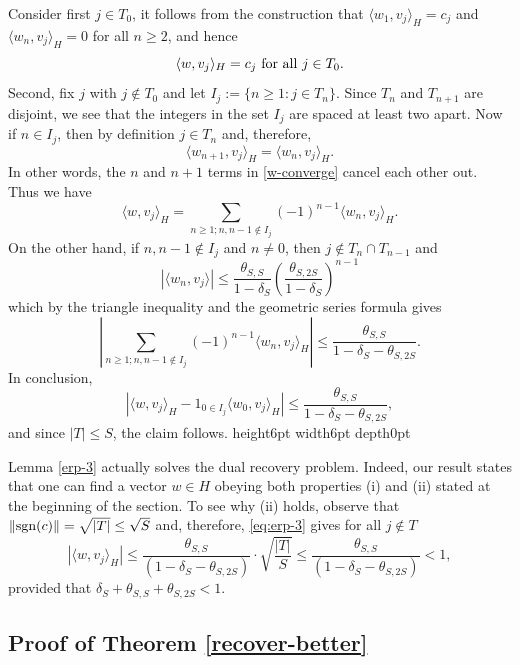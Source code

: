 \documentclass[11pt]{article}
\def\sgn{{\hbox{sgn}}}
\newenvironment{proof}{\noindent {\bf Proof} }{\endprf\par}
\def \endprf{\hfill {\vrule height6pt width6pt depth0pt}\medskip}
\newcommand{\<}{\langle}
\renewcommand{\>}{\rangle}
\numberwithin{equation}{section}
\begin{document}
\begin{proof}
Consider first $j \in T_0$, it follows from the construction that
$\langle w_1, v_j \rangle_H = c_j$ and $\langle w_n, v_j \rangle_H =
0$ for all $n \geq 2$, and hence
\[
\langle w, v_j \rangle_H = c_j \hbox{ for all } j \in T_0.
\]
Second, fix $j$ with $j \not \in T_0$ and let $I_j := \{ n \geq 1: j
\in T_n \}$.  Since $T_n$ and $T_{n+1}$ are disjoint, we see that the
integers in the set $I_j$ are spaced at least two apart.  Now if $n
\in I_j$, then by definition $j \in T_n$ and, therefore,
\[
\langle w_{n+1}, v_j \rangle_H = \langle w_n, v_j \rangle_H.
\]
In other words, the $n$ and $n+1$ terms in \eqref{w-converge} cancel
each other out.  Thus we have
\[
\langle w, v_j \rangle_H = \sum_{n \geq 1; n, n-1 \not \in I_j}
(-1)^{n-1} \langle w_n, v_j\rangle_H.
\]
On the other hand, if $n, n-1
\not \in I_j$ and $n \neq 0$, then $j \not \in T_n \cap T_{n-1}$ and 
$$
|\langle w_{n}, v_j \rangle| \leq \frac{\theta_{S,S}}{1 -
  \delta_{S}} \left(\frac{\theta_{S,2S}}{1-\delta_S}\right)^{n-1}$$
which by the triangle inequality and the geometric series formula
gives
$$
|\sum_{n \geq 1; n, n-1 \not \in I_j} (-1)^{n-1} \langle w_n,
v_j\rangle_H| \leq \frac{\theta_{S,S}}{1 - \delta_S -
  \theta_{S,2S}}.$$
In conclusion, 
$$
|\langle w, v_j \rangle_H - 1_{0 \in I_j} \langle w_0, v_j
\rangle_H| \leq \frac{\theta_{S,S}}{1 - \delta_S - \theta_{S,2S}},$$
and since $|T| \leq S$, the claim follows.
\end{proof}

Lemma \ref{erp-3} actually solves the dual recovery problem. Indeed,
our result states that one can find a vector $w \in H$ obeying both
properties (i) and (ii) stated at the beginning of the section. To see
why (ii) holds, observe that $\|\sgn(c)\| = \sqrt{|T|} \le \sqrt{S}$
and, therefore, \eqref{eq:erp-3} gives for all $j \not \in T$
\begin{equation*}
  |\langle w, v_j \rangle_H| \leq 
\frac{\theta_{S,S}}{(1 - \delta_S - \theta_{S,2S})} \cdot 
\sqrt{\frac{|T|}{S}} 
  \leq \frac{\theta_{S,S}}{(1 - \delta_S - \theta_{S,2S})} < 1,
\end{equation*}
provided that $\delta_S + \theta_{S,S} + \theta_{S,2S} < 1$.

\subsection{Proof of Theorem \ref{recover-better}}  
\label{sec:main-proof}
\end{document}
